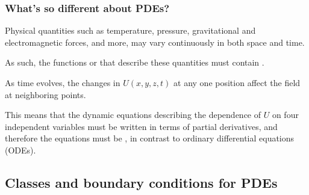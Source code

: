 \documentclass[hyperref={colorlinks=true}]{beamer}
\begin{document}
\begin{frame}%
  \frametitle{What's so different about PDEs?}

  Physical quantities such as temperature, pressure, gravitational and electromagnetic forces, and more, may vary continuously in both space and time. 
  
  \mysp
  
  As such, the functions or  that describe these quantities must contain .
  
  \mysp
  
  As time evolves, the changes in $U (x, y, z, t)$ at any one position affect the field at neighboring points. 
  
  \mysp
  
  This means that the dynamic equations describing the dependence of $U$ on four independent variables must be written in terms of partial derivatives, and therefore the equations must be , in contrast to ordinary differential equations (ODEs).
  
\end{frame}

\subsection[Classes and boundary conditions for PDEs]{Classes and boundary conditions for PDEs}
\end{document}
